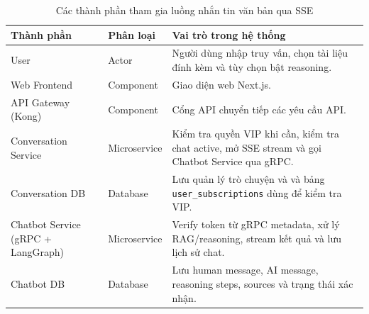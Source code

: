 
\begin{table}[H]
\centering
\renewcommand{\arraystretch}{1.3}

\begin{tabular}{|l|l|p{5cm}|}
\hline
\textbf{Thành phần} & \textbf{Phân loại} & \textbf{Vai trò trong hệ thống} \\ \hline
User & Actor & Người dùng nhập truy vấn, chọn tài liệu đính kèm và tùy chọn bật reasoning. \\ \hline
Web Frontend & Component & Giao diện web Next.js. \\ \hline
API Gateway (Kong) & Component & Cổng API chuyển tiếp các yêu cầu API. \\ \hline
Conversation Service & Microservice & Kiểm tra quyền VIP khi cần, kiểm tra chat active, mở SSE stream và gọi Chatbot Service qua gRPC. \\ \hline
Conversation DB & Database & Lưu quản lý trò chuyện và và bảng \texttt{user\_subscriptions} dùng để kiểm tra VIP. \\ \hline
Chatbot Service (gRPC + LangGraph) & Microservice & Verify token từ gRPC metadata, xử lý RAG/reasoning, stream kết quả và lưu lịch sử chat. \\ \hline
Chatbot DB & Database & Lưu human message, AI message, reasoning steps, sources và trạng thái xác nhận. \\ \hline
\end{tabular}
\caption{Các thành phần tham gia luồng nhắn tin văn bản qua SSE}
\end{table}
